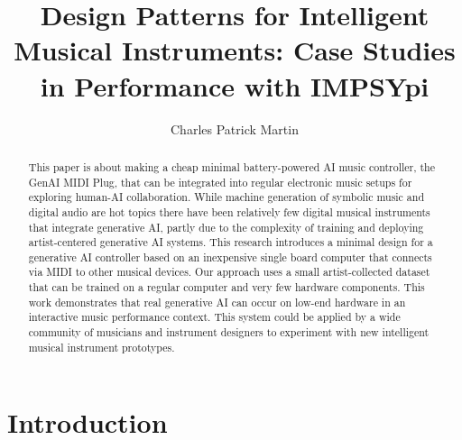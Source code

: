 \documentclass[manuscript,review,anonymous]{acmart}
\begin{document}
\title{Design Patterns for Intelligent Musical Instruments: Case Studies in Performance with IMPSYpi}

\author{Charles Patrick Martin}


\begin{abstract}
This paper is about making a cheap minimal battery-powered AI music controller, the GenAI MIDI Plug, that can be integrated into regular electronic music setups for exploring human-AI collaboration.
While machine generation of symbolic music and digital audio are hot topics there have been relatively few digital musical instruments that integrate generative AI, partly due to the complexity of training and deploying artist-centered generative AI systems.
This research introduces a minimal design for a generative AI controller based on an inexpensive single board computer that connects via MIDI to other musical devices.
Our approach uses a small artist-collected dataset that can be trained on a regular computer and very few hardware components.
This work demonstrates that real generative AI can occur on low-end hardware in an interactive music performance context. 
This system could be applied by a wide community of musicians and instrument designers to experiment with new intelligent musical instrument prototypes.
\end{abstract}



\maketitle

\section{Introduction}\label{intro}
\end{document}
